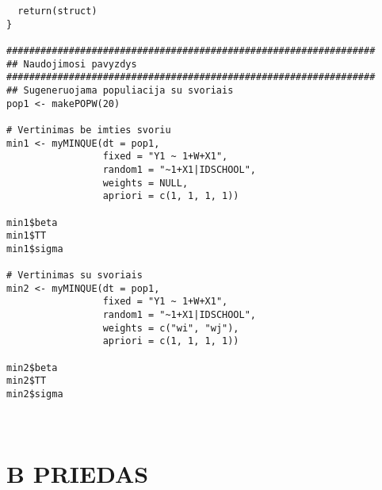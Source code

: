\documentclass[11pt,a4paper]{article}
\begin{document}
\begin{appendix}
\begin{small}
\begin{verbatim}
  return(struct)
}

#################################################################
## Naudojimosi pavyzdys
#################################################################
## Sugeneruojama populiacija su svoriais
pop1 <- makePOPW(20)

# Vertinimas be imties svoriu
min1 <- myMINQUE(dt = pop1,
                 fixed = "Y1 ~ 1+W+X1",
                 random1 = "~1+X1|IDSCHOOL",
                 weights = NULL,
                 apriori = c(1, 1, 1, 1))

min1$beta
min1$TT
min1$sigma

# Vertinimas su svoriais
min2 <- myMINQUE(dt = pop1,
                 fixed = "Y1 ~ 1+W+X1",
                 random1 = "~1+X1|IDSCHOOL",
                 weights = c("wi", "wj"),
                 apriori = c(1, 1, 1, 1))

min2$beta
min2$TT
min2$sigma



\end{verbatim}
\end{small}
\end{appendix}


 \hypertarget{appendixb}{\section*{B PRIEDAS}}
\end{document}

